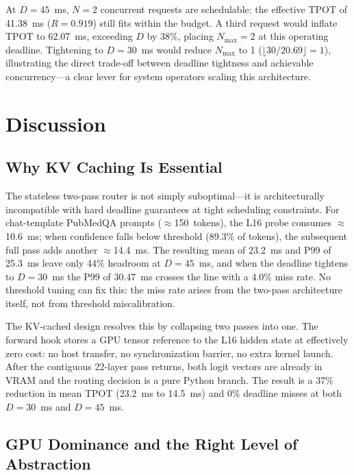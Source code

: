 \documentclass[conference]{IEEEtran}
\begin{document}
At $D=45$~ms, $N=2$ concurrent requests are schedulable: the effective
TPOT of 41.38~ms ($R=0.919$) still fits within the budget.
A third request would inflate TPOT to 62.07~ms, exceeding $D$ by 38\%,
placing $N_{\max}=2$ at this operating deadline.
Tightening to $D=30$~ms would reduce $N_{\max}$ to 1
($\lfloor 30/20.69 \rfloor = 1$), illustrating the direct trade-off
between deadline tightness and achievable concurrency---a clear lever
for system operators scaling this architecture.

\section{Discussion}

\subsection{Why KV Caching Is Essential}

The stateless two-pass router is not simply suboptimal---it is
architecturally incompatible with hard deadline guarantees at tight
scheduling constraints.
For chat-template PubMedQA prompts ($\approx$150~tokens), the L16 probe
consumes $\approx$10.6~ms; when confidence falls below threshold
(89.3\% of tokens), the subsequent full pass adds another $\approx$14.4~ms.
The resulting mean of 23.2~ms and P99 of 25.3~ms leave only 44\%
headroom at $D=45$~ms, and when the deadline tightens to $D=30$~ms
the P99 of 30.47~ms crosses the line with a 4.0\% miss rate.
No threshold tuning can fix this: the miss rate arises from
the two-pass architecture itself, not from threshold miscalibration.

The KV-cached design resolves this by collapsing two passes into one.
The forward hook stores a GPU tensor reference to the L16 hidden state
at effectively zero cost: no host transfer, no synchronization barrier,
no extra kernel launch.
After the contiguous 22-layer pass returns, both logit vectors are
already in VRAM and the routing decision is a pure Python branch.
The result is a 37\% reduction in mean TPOT (23.2~ms to 14.5~ms) and
0\% deadline misses at both $D=30$~ms and $D=45$~ms.

\subsection{GPU Dominance and the Right Level of Abstraction}
\end{document}
